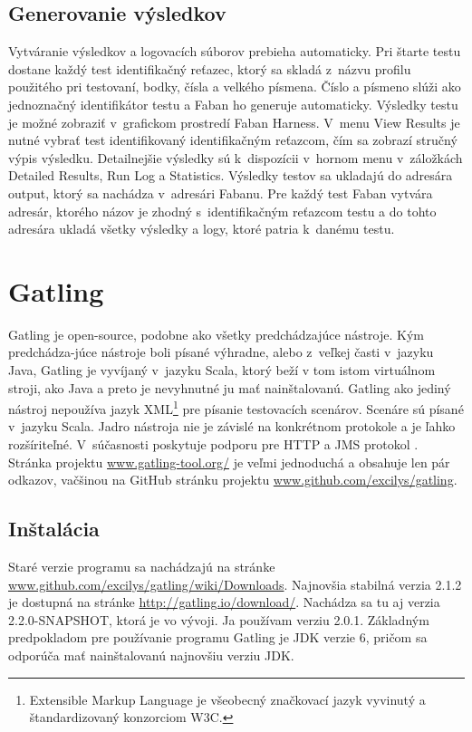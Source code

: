 \documentclass[12pt,oneside,final]{fithesis-utf8}
\begin{document}
\subsection{Generovanie výsledkov}
Vytváranie výsledkov a logovacích súborov prebieha automaticky. Pri štarte testu dostane každý test identifikačný reťazec, ktorý sa skladá z~názvu profilu použitého pri testovaní, bodky, čísla a velkého písmena. Číslo a písmeno slúži ako jednoznačný identifikátor testu a Faban ho generuje automaticky. Výsledky testu je možné zobraziť v~grafickom prostredí Faban Harness. V~menu View Results je nutné vybrať test identifikovaný identifikačným reťazcom, čím sa zobrazí stručný výpis výsledku. Detailnejšie výsledky sú k~dispozícii v~hornom menu v~záložkách Detailed Results, Run Log a Statistics. Výsledky testov sa ukladajú do adresára output, ktorý sa nachádza v~adresári Fabanu. Pre každý test Faban vytvára adresár, ktorého názov je zhodný s~identifikačným reťazcom testu a do tohto adresára ukladá všetky výsledky a logy, ktoré patria k~danému testu.

\newpage
\section{Gatling}
Gatling je open-source, podobne ako všetky predchádzajúce nástroje. Kým predchádza-júce nástroje boli písané výhradne, alebo z~veľkej časti v~jazyku Java, Gatling je vyvíjaný v~jazyku Scala, ktorý beží v tom istom virtuálnom stroji, ako Java a preto je nevyhnutné ju mať nainštalovanú. Gatling ako jediný nástroj nepoužíva jazyk XML\footnote{Extensible Markup Language je všeobecný značkovací jazyk vyvinutý a štandardizovaný konzorciom W3C.} pre písanie testovacích scenárov. Scenáre sú písané v~jazyku Scala. Jadro nástroja nie je závislé na konkrétnom protokole a je ľahko rozšíriteľné. V~súčasnosti poskytuje podporu pre HTTP a JMS protokol \cite{Gatling}. Stránka projektu \url{www.gatling-tool.org/} je veľmi jednoduchá a obsahuje len pár odkazov, vačšinou na GitHub stránku projektu \url{www.github.com/excilys/gatling}.

\subsection{Inštalácia}
Staré verzie programu sa nachádzajú na stránke \url{www.github.com/excilys/gatling/wiki/Downloads}. Najnovšia stabilná verzia 2.1.2 je dostupná na stránke \url{http://gatling.io/download/}. Nachádza sa tu aj verzia 2.2.0-SNAPSHOT, ktorá je vo vývoji. Ja používam verziu 2.0.1. Základným predpokladom pre používanie programu Gatling je JDK verzie 6, pričom sa odporúča mať nainštalovanú najnovšiu verziu JDK.
\end{document}
